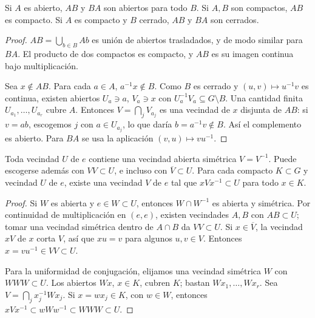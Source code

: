 \begin{proposicion}
Si $A$ es abierto, $AB$ y $BA$ son abiertos para todo $B$. Si $A,B$ son compactos, $AB$ es compacto. Si $A$ es compacto y $B$ cerrado, $AB$ y $BA$ son cerrados.
\end{proposicion}
\begin{proof}
$AB=\bigcup_{b\in B}Ab$ es unión de abiertos trasladados, y de modo similar para $BA$. El producto de dos compactos es compacto, y $AB$ es su imagen continua bajo multiplicación.

Sea $x\notin AB$. Para cada $a\in A$, $a^{-1}x\notin B$. Como $B$ es cerrado y $(u,v)\mapsto u^{-1}v$ es continua, existen abiertos $U_a\ni a$, $V_a\ni x$ con $U_a^{-1}V_a\subseteq G\setminus B$. Una cantidad finita $U_{a_1},\ldots,U_{a_r}$ cubre $A$. Entonces $V=\bigcap_jV_{a_j}$ es una vecindad de $x$ disjunta de $AB$: si $v=ab$, escogemos $j$ con $a\in U_{a_j}$, lo que daría $b=a^{-1}v\notin B$. Así el complemento es abierto. Para $BA$ se usa la aplicación $(v,u)\mapsto vu^{-1}$.
\end{proof}
\begin{proposicion}\label{v4:vecindades-grupo}
Toda vecindad $U$ de $e$ contiene una vecindad abierta simétrica $V=V^{-1}$. Puede escogerse además con $VV\subset U$, e incluso con $\overline V\subset U$. Para cada compacto $K\subset G$ y vecindad $U$ de $e$, existe una vecindad $V$ de $e$ tal que $xVx^{-1}\subset U$ para todo $x\in K$.
\end{proposicion}
\begin{proof}
Si $W$ es abierta y $e\in W\subset U$, entonces $W\cap W^{-1}$ es abierta y simétrica. Por continuidad de multiplicación en $(e,e)$, existen vecindades $A,B$ con $AB\subset U$; tomar una vecindad simétrica dentro de $A\cap B$ da $VV\subset U$. Si $x\in\overline V$, la vecindad $xV$ de $x$ corta $V$, así que $xu=v$ para algunos $u,v\in V$. Entonces $x=vu^{-1}\in VV\subset U$.

Para la uniformidad de conjugación, elijamos una vecindad simétrica $W$ con $WWW\subset U$. Los abiertos $Wx$, $x\in K$, cubren $K$; bastan $Wx_1,\ldots,Wx_r$. Sea $V=\bigcap_jx_j^{-1}Wx_j$. Si $x=wx_j\in K$, con $w\in W$, entonces $xVx^{-1}\subset wWw^{-1}\subset WWW\subset U$.
\end{proof}
